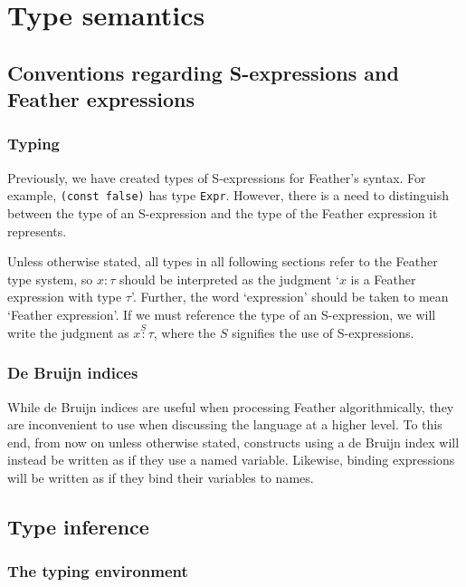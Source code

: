 \documentclass[UKenglish, 11pt, a4paper, parskip=half]{scrbook}
\newcommand{\inlinecode}[1]{\lstinline{#1}}
\begin{document}
\chapter{Type semantics}

\section{Conventions regarding S-expressions and Feather expressions}

\subsection{Typing}

Previously, we have created types of S-expressions for Feather's syntax.
For example, \inlinecode{(const false)} has type \inlinecode{Expr}.
However, there is a need to distinguish between the type of an S-expression and the type of the Feather expression it represents.

Unless otherwise stated, all types in all following sections refer to the Feather type system, so \( x : \tau \) should be interpreted as the judgment `\( x \) is a Feather expression with type \( \tau \)'.
Further, the word `expression' should be taken to mean `Feather expression'.
If we must reference the type of an S-expression, we will write the judgment as \( x \overset{S}{:} \tau \), where the \( S \) signifies the use of S-expressions.

\subsection{De Bruijn indices}

While de Bruijn indices are useful when processing Feather algorithmically, they are inconvenient to use when discussing the language at a higher level.
To this end, from now on unless otherwise stated, constructs using a de Bruijn index will instead be written as if they use a named variable.
Likewise, binding expressions will be written as if they bind their variables to names.

\section{Type inference}


\subsection{The typing environment}
\end{document}
